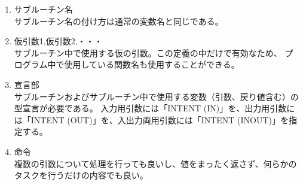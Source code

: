 \begin{enumerate}
\item サブルーチン名\\
サブルーチン名の付け方は通常の変数名と同じである。
\item 仮引数1,仮引数2,・・・\\
サブルーチン中で使用する仮の引数。この定義の中だけで有効なため、
プログラム中で使用している関数名も使用することができる。
\item 宣言部\\
サブルーチンおよびサブルーチン中で使用する変数（引数、戻り値含む）の型宣言が必要である。
入力用引数には「INTENT (IN)」を、出力用引数には「INTENT (OUT)」を、入出力両用引数には「INTENT (INOUT)」を指定する。
\item 命令\\
複数の引数について処理を行っても良いし、値をまったく返さず、何らかのタスクを行うだけの内容でも良い。\\
\end{enumerate}
